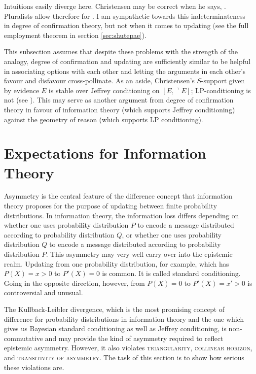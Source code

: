 \documentclass[phd,12pt,oneside]{ubcthesis}
\begin{document}
Intuitions easily diverge here. Christensen may be correct when he
says, 
. Pluralists allow therefore for
. I am sym\-path\-etic towards this
indeterminateness in degree of confirmation theory, but not when it
comes to updating (see the full employment theorem in section
\ref{sec:shutepae}).

This subsection assumes that despite these problems with the strength
of the analogy, degree of confirmation and updating are sufficiently
similar to be helpful in associating options with each other and
letting the arguments in each other's favour and disfavour
cross-pollinate. As an aside, Christensen's $S$-support given by
evidence $E$ is stable over Jeffrey conditioning on
$[E,\urcorner{}E]$; LP-conditioning is not (see
). This may serve as another argument
from degree of confirmation theory in favour of information theory
(which supports Jeffrey conditioning) against the geometry of reason
(which supports LP conditioning).

\section{Expectations for Information Theory}
\label{sec:expinfth}

Asymmetry is the central feature of the difference concept that
information theory proposes for the purpose of updating between finite
probability distributions. In information theory, the information loss
differs depending on whether one uses probability distribution $P$ to
encode a message distributed according to probability distribution
$Q$, or whether one uses probability distribution $Q$ to encode a
message distributed according to probability distribution $P$. This
asymmetry may very well carry over into the epistemic realm. Updating
from one probability distribution, for example, which has $P(X)=x>0$
to $P'(X)=0$ is common. It is called standard conditioning. Going in
the opposite direction, however, from $P(X)=0$ to $P'(X)=x'>0$ is
controversial and unusual.

The Kullback-Leibler divergence, which is the most promising concept
of difference for probability distributions in information theory and
the one which gives us Bayesian standard conditioning as well as
Jeffrey conditioning, is non-commutative and may provide the kind of
asymmetry required to reflect epistemic asymmetry. However, it also
violates \textsc{triangularity}, \textsc{collinear horizon}, and
\textsc{transitivity of asymmetry}. The task of this section is to
show how serious these violations are.
\end{document}
